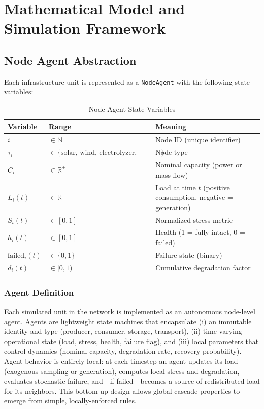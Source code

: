 \documentclass[12pt,a4paper,twoside]{report}
\begin{document}
\chapter{Mathematical Model and Simulation Framework}

\section{Node Agent Abstraction}

Each infrastructure unit is represented as a \texttt{NodeAgent} with the following state variables:

\begin{table}[htbp]
\centering
\caption{Node Agent State Variables}
\small
\begin{tabularx}{\textwidth}{p{2.4cm} p{3.2cm} X}
\toprule
\textbf{Variable} & \textbf{Range} & \textbf{Meaning} \\
\midrule
$i$ & $\in \mathbb{N}$ & Node ID (unique identifier) \\
$\tau_i$ & $\in \{\text{solar, wind, electrolyzer, storage, ammonia, pipeline}\}$ & Node type \\
$C_i$ & $\in \mathbb{R}^+$ & Nominal capacity (power or mass flow) \\
$L_i(t)$ & $\in \mathbb{R}$ & Load at time $t$ (positive = consumption, negative = generation) \\
$S_i(t)$ & $\in [0,1]$ & Normalized stress metric \\
$h_i(t)$ & $\in [0,1]$ & Health (1 = fully intact, 0 = failed) \\
$\mathrm{failed}_i(t)$ & $\in \{0,1\}$ & Failure state (binary) \\
$d_i(t)$ & $\in [0,1)$ & Cumulative degradation factor \\
\bottomrule
\end{tabularx}
\end{table}

\subsection{Agent Definition}

Each simulated unit in the network is implemented as an autonomous node-level agent. Agents are lightweight state machines that encapsulate (i) an immutable identity and type (producer, consumer, storage, transport), (ii) time-varying operational state (load, stress, health, failure flag), and (iii) local parameters that control dynamics (nominal capacity, degradation rate, recovery probability). Agent behavior is entirely local: at each timestep an agent updates its load (exogenous sampling or generation), computes local stress and degradation, evaluates stochastic failure, and—if failed—becomes a source of redistributed load for its neighbors. This bottom-up design allows global cascade properties to emerge from simple, locally-enforced rules.
\end{document}

